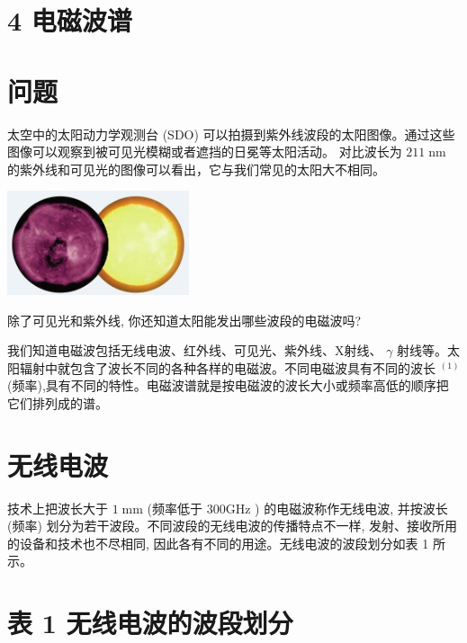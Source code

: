 \documentclass[10pt]{article}
\begin{document}
\section*{4 电磁波谱}

\section*{问题}

太空中的太阳动力学观测台 (SDO) 可以拍摄到紫外线波段的太阳图像。通过这些图像可以观察到被可见光模糊或者遮挡的日冕等太阳活动。 对比波长为 \({211}\mathrm{\;{nm}}\) 的紫外线和可见光的图像可以看出，它与我们常见的太阳大不相同。

\begin{center}
\includegraphics[max width=0.4\textwidth]{images/01910e72-c5b7-7ed5-a6d4-fb3a5faefc32_88_347664.jpg}
\end{center}

除了可见光和紫外线, 你还知道太阳能发出哪些波段的电磁波吗?

我们知道电磁波包括无线电波、红外线、可见光、紫外线、X射线、 \(\gamma\) 射线等。太阳辐射中就包含了波长不同的各种各样的电磁波。不同电磁波具有不同的波长 \({}^{\left( 1\right) }\) (频率),具有不同的特性。电磁波谱就是按电磁波的波长大小或频率高低的顺序把它们排列成的谱。

\section*{无线电波}

技术上把波长大于 \(1\mathrm{\;{mm}}\) (频率低于 \({300}\mathrm{{GHz}}\) ) 的电磁波称作无线电波, 并按波长 (频率) 划分为若干波段。不同波段的无线电波的传播特点不一样, 发射、接收所用的设备和技术也不尽相同, 因此各有不同的用途。无线电波的波段划分如表 1 所示。

\section*{表 1 无线电波的波段划分}

\begin{center}
\end{center}
\end{document}
